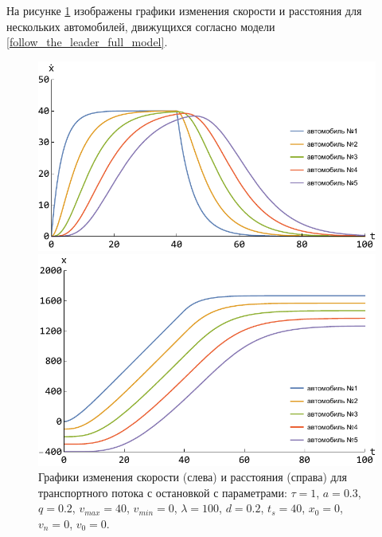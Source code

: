 \documentclass[12pt, a4paper]{extarticle}
\numberwithin{equation}{section}
\numberwithin{figure}{section}
\begin{document}
На рисунке \ref{follow_the_leader} изображены графики изменения скорости и расстояния для нескольких автомобилей, движущихся согласно модели \eqref{follow_the_leader_full_model}.

\begin{figure}[h!]
	\begin{center}
		\begin{minipage}[h!]{0.48\linewidth}
			\includegraphics[width=1\linewidth,height=0.2\textheight]
			{Images/simple_model_speed.pdf}
		\end{minipage}
		\hfill 
		\begin{minipage}[h!]{0.48\linewidth}
			\includegraphics[width=1\linewidth,height=0.2\textheight]
			{Images/simple_model_distance.pdf}
		\end{minipage}
		\caption{Графики изменения скорости (слева) и расстояния (справа) для транспортного потока с остановкой с параметрами: $\tau=1$, $a=0.3$, $q=0.2$, $v_{max}=40$, $v_{min}=0$, $\lambda=100$, $d=0.2$, $t_s=40$, $x_0=0$, $v_n=0$, $v_0=0$.}
		\label{follow_the_leader}
	\end{center}
\end{figure}
\end{document}
